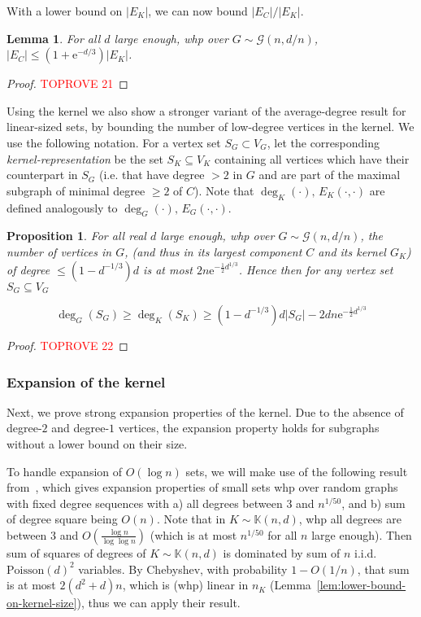 \documentclass[11pt]{article}
\theoremstyle{plain}
\newtheorem{lemma}[theorem]{Lemma}
\newtheorem{proposition}[theorem]{Proposition}
\newcommand{\G}{\mathcal{G}}
\newcommand{\emm}{\mathrm{e}}
\newcommand{\1}{\mathbb{1}}
\newcommand{\Kb}{\mathbb{K}}
\newcommand{\Poisson}{\text{Poisson}}
\begin{document}
With a lower bound on \(|E_K|\), we can now bound \(|E_C|/|E_K|\).

\begin{lemma}\label{lem:not-too-many-expanded-edges-overal}
    For all \(d\) large enough, whp over \(G\sim\G(n,d/n)\), \(|E_C| \leq (1+\emm^{-d/3})|E_K|\). 
\end{lemma}
\begin{proof}\textcolor{red}{TOPROVE 21}\end{proof}

Using the kernel we also show a stronger variant of the average-degree result for linear-sized sets, by bounding the number of low-degree vertices in the kernel.
We use the following notation. For a vertex set \(S_G\subset V_G\), let the corresponding \textit{kernel-representation} be the set \(S_K\subseteq V_K\) containing all vertices which have their counterpart in \(S_G\) (i.e. that have degree \(>2\) in \(G\) and are part of the maximal subgraph of minimal degree \(\geq 2\) of \(C\)). Note that \(\deg_K(\cdot),\, E_K(\cdot,\cdot)\) are defined analogously to \(\deg_G(\cdot),\, E_G(\cdot,\cdot)\).

\begin{proposition}\label{prop:exponentially-few-small-degree-vertices}
For all real \(d\) large enough, whp over \(G\sim\G(n,d/n)\), the number of vertices in \(G\), (and thus in its largest component \(C\) and its kernel \(G_K\)) of degree \(\leq(1-d^{-1/3})d\) is at most \(2n\emm^{-\frac 12 d^{1/3}}\). Hence then for any vertex set \(S_G\subseteq V_G\)

    \[
    \deg_G(S_G) \geq \deg_K(S_K) \geq (1-d^{-1/3})d|S_G| - 2dn\emm^{-\frac 12d^{1/3}}
    \]
\end{proposition}
\begin{proof}\textcolor{red}{TOPROVE 22}\end{proof}

\subsubsection{Expansion of the kernel}

Next, we prove strong expansion properties of the kernel. Due to the absence of degree-\(2\) and degree-\(1\) vertices, the expansion property holds for subgraphs without a lower bound on their size.

To handle expansion of \(O(\log n)\) sets, we will make use of the following result from~\cite{GALANIS2022104894}, which gives expansion properties of small sets whp over random graphs with fixed degree sequences with a) all degrees between \(3\) and \(n^{1/50}\), and b) sum of degree square being \(O(n)\). Note that in \(K\sim\Kb(n,d)\), whp all degrees are between \(3\) and \(O(\frac{\log n}{\log \log n})\) (which is at most \(n^{1/50}\) for all \(n\) large enough). Then sum of squares of degrees of \(K\sim\Kb(n,d)\) is dominated by sum of \(n\) i.i.d. \(\Poisson(d)^2\) variables. By Chebyshev, with probability \(1-O(1/n)\), that sum is at most \(2(d^2+d)n\), which is (whp) linear in \(n_K\) (Lemma~\ref{lem:lower-bound-on-kernel-size}), thus we can apply their result.
\end{document}
